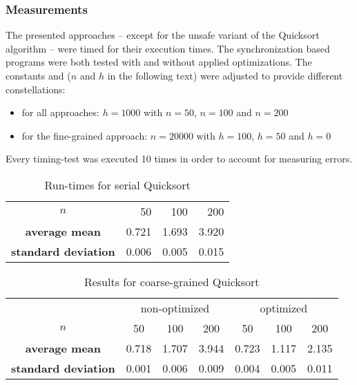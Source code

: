 \subsubsection{Measurements}
The presented approaches -- except for the unsafe variant of the Quicksort algorithm -- were timed for their execution times. The synchronization based programs were both tested with and without applied optimizations. The constants  and  ($n$ and $h$ in the following text) were adjusted to provide different constellations:
\begin{itemize}
\item for all approaches: $h = 1000$ with $n = 50$, $n = 100$ and $n = 200$
\item for the fine-grained approach: $n = 20000$ with $h = 100$, $h = 50$ and $h = 0$
\end{itemize}
Every timing-test was executed 10 times in order to account for measuring errors.

\begin{table}[h!]
\begin{center}
\begin{tabular}{ c| r|r|r|}
\cline{2-4} $n$ & 50 & 100 & 200 \\ 
\cline{2-4} \textbf{average mean} & 0.721 & 1.693 & 3.920 \\ 
\cline{2-4} \textbf{standard deviation} & 0.006 & 0.005 & 0.015 \\ 
\cline{2-4}
\end{tabular} 
\caption{Run-times for serial Quicksort}
\label{table:serial_quicksort}
\end{center}
\end{table}


\begin{table}[h!]
\begin{center}
\begin{tabular}{c |c|c|c||c|c|c|}
  \multicolumn{1}{c}{} & \multicolumn{3}{c}{non-optimized} & \multicolumn{3}{c}{optimized}\\ \cline{2-7}
  $n$ & 50 & 100 & 200 & 50 & 100 & 200\\ \cline{2-7}
  \textbf{average mean} & 0.718 & 1.707 & 3.944 & 0.723 & 1.117 & 2.135	\\ \cline{2-7}
  \textbf{standard deviation} & 0.001 & 0.006 & 0.009 & 0.004 & 0.005 & 0.011\\ \cline{2-7}
\end{tabular}
\caption{Results for coarse-grained Quicksort}
\label{table:coarse_quicksort}
\end{center}
\end{table}


